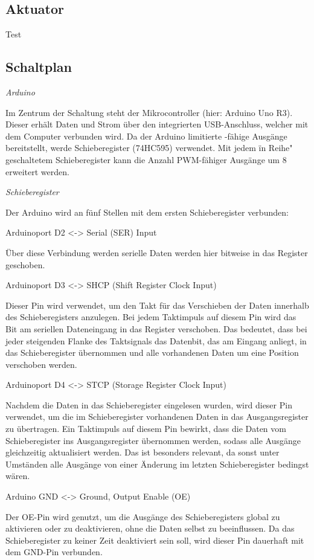 \subsection{Aktuator}\label{subsec:aktuator}
Test
\subsection{Schaltplan}

\textit{Arduino}

Im Zentrum der Schaltung steht der Mikrocontroller (hier: Arduino Uno R3).
Dieser erhält Daten und Strom über den integrierten USB-Anschluss, welcher mit dem Computer verbunden wird.
Da der Arduino limitierte -fähige Ausgänge bereitstellt, werde Schieberegister (74HC595) verwendet.
Mit jedem \"in Reihe" geschaltetem Schieberegister kann die Anzahl PWM-fähiger Ausgänge um 8 erweitert werden.

\textit{Schieberegister}

Der Arduino wird an fünf Stellen mit dem ersten Schieberegister verbunden:

Arduinoport D2 <-> Serial (SER) Input

Über diese Verbindung werden serielle Daten werden hier bitweise in das Register geschoben.

Arduinoport D3 <-> SHCP (Shift Register Clock Input)

Dieser Pin wird verwendet, um den Takt für das Verschieben der Daten innerhalb des Schieberegisters anzulegen.
Bei jedem Taktimpuls auf diesem Pin wird das Bit am seriellen Dateneingang in das Register verschoben.
Das bedeutet, dass bei jeder steigenden Flanke des Taktsignals das Datenbit, das am Eingang anliegt, in das Schieberegister übernommen und alle vorhandenen Daten um eine Position verschoben werden.

Arduinoport D4 <-> STCP (Storage Register Clock Input)

Nachdem die Daten in das Schieberegister eingelesen wurden, wird dieser Pin verwendet, um die im Schieberegister vorhandenen Daten in das Ausgangsregister zu übertragen.
Ein Taktimpuls auf diesem Pin bewirkt, dass die Daten vom Schieberegister ins Ausgangsregister übernommen werden, sodass alle Ausgänge gleichzeitig aktualisiert werden.
Das ist besonders relevant, da sonst unter Umständen alle Ausgänge von einer Änderung im letzten Schieberegister bedingst wären.

Arduino GND <-> Ground, Output Enable (OE)

Der OE-Pin wird genutzt, um die Ausgänge des Schieberegisters global zu aktivieren oder zu deaktivieren, ohne die Daten selbst zu beeinflussen.
Da das Schieberegister zu keiner Zeit deaktiviert sein soll, wird dieser Pin dauerhaft mit dem GND-Pin verbunden.

